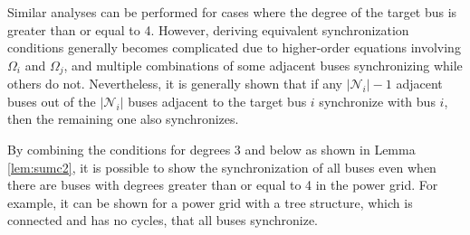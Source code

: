 \documentclass[graybox, envcountchap]{svmult}
\begin{document}
Similar analyses can be performed for cases where the degree of the target bus
is greater than or equal to 4. However, deriving equivalent synchronization
conditions generally becomes complicated due to higher-order equations involving
$\Omega_i$ and $\Omega_j$, and multiple combinations of some adjacent buses
synchronizing while others do not. Nevertheless, it is generally shown that if
any $|\mathcal{N}_i|-1$ adjacent buses out of the $|\mathcal{N}_i|$ buses
adjacent to the target bus $i$ synchronize with bus $i$, then the remaining one
also synchronizes.

By combining the conditions for degrees 3 and below as shown in Lemma
\ref{lem:sumc2}, it is possible to show the synchronization of all buses even
when there are buses with degrees greater than or equal to 4 in the power grid.
For example, it can be shown for a power grid with a tree structure, which is
connected and has no cycles, that all buses synchronize.
\end{document}
